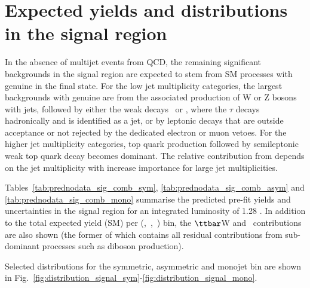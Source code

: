 \section{Expected yields and distributions in the signal region}

In the absence of multijet events from QCD, the remaining significant backgrounds in the signal region are expected to stem from SM
processes with genuine \met in the final state. For the low jet multiplicity categories, the largest backgrounds with genuine \met are
from the associated production of W or Z bosons with jets, followed by either the weak decays \znunu\ or \wtaunu, where the $\tau$ decays
hadronically and is identified as a jet, or by leptonic decays that are outside acceptance or not rejected by the dedicated electron or
muon vetoes. For the higher jet multiplicity categories, top quark production followed by semileptonic weak top quark decay becomes
dominant. The relative contribution from \ttbar depends on the jet multiplicity with increase importance for large jet multiplicities.

Tables~\ref{tab:prednodata_sig_comb_sym},
\ref{tab:prednodata_sig_comb_asym} and \ref{tab:prednodata_sig_comb_mono} 
summarise the predicted pre-fit yields and uncertainties in the signal region for an integrated
luminosity of 1.28 \ifb. In addition to the total expected yield (SM) per (\njet,~\nb,~\scalht) bin, the $\ttbar$W and \znunu\ contributions
are also shown (the former of which contains all residual contributions from sub-dominant processes such as \eg diboson
production).
\clearpage

\clearpage

\clearpage



Selected distributions for the symmetric, asymmetric and monojet bin are shown in Fig.~\ref{fig:distribution_signal_sym}-\ref{fig:distribution_signal_mono}.
\clearpage

